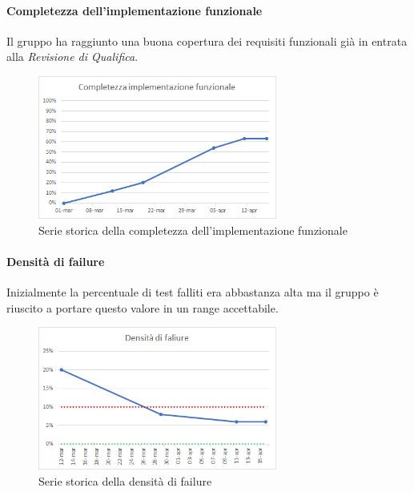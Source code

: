     \paragraph{Completezza dell'implementazione funzionale} \Spazio
    Il gruppo ha raggiunto una buona copertura dei requisiti funzionali già in entrata alla \emph{Revisione di Qualifica}.
    \begin{figure}[H]
    	\centering 
    	\includegraphics[width=0.7\textwidth]{Images/completezza-funzionale.png}
    	\caption{Serie storica della completezza dell'implementazione funzionale}
    	\label{cf} 
    \end{figure}
     \paragraph{Densità di failure} \Spazio
    Inizialmente la percentuale di test falliti era abbastanza alta ma il gruppo è riuscito a portare questo valore in un range accettabile.
    \begin{figure}[H]
    	\centering 
    	\includegraphics[width=0.7\textwidth]{Images/fail.png}
    	\caption{Serie storica della densità di failure}
    	\label{fail} 
    \end{figure} 
